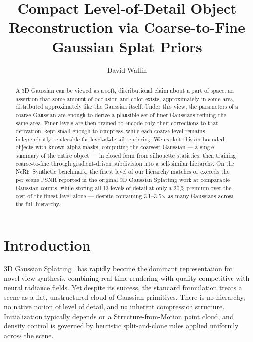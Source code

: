 \documentclass[acmtog]{acmart}
\begin{document}
\title{Compact Level-of-Detail Object Reconstruction via Coarse-to-Fine Gaussian Splat Priors}

\author{David Wallin}
\email{}

\begin{abstract}
A 3D Gaussian can be viewed as a soft, distributional claim about a part of space: an assertion that some amount of occlusion and color exists, approximately in some area, distributed approximately like the Gaussian itself. Under this view, the parameters of a coarse Gaussian are enough to derive a plausible set of finer Gaussians refining the same area. Finer levels are then trained to encode only their corrections to that derivation, kept small enough to compress, while each coarse level remains independently renderable for level-of-detail rendering. We exploit this on bounded objects with known alpha masks, computing the coarsest Gaussian --- a single summary of the entire object --- in closed form from silhouette statistics, then training coarse-to-fine through gradient-driven subdivision into a self-similar hierarchy. On the NeRF Synthetic benchmark, the finest level of our hierarchy matches or exceeds the per-scene PSNR reported in the original 3D Gaussian Splatting work at comparable Gaussian counts, while storing all 13 levels of detail at only a 20\% premium over the cost of the finest level alone --- despite containing 3.1--3.5$\times$ as many Gaussians across the full hierarchy.
\end{abstract}

\maketitle

\section{Introduction}

3D Gaussian Splatting~\cite{kerbl3Dgaussians} has rapidly become the dominant representation for novel-view synthesis, combining real-time rendering with quality competitive with neural radiance fields. Yet despite its success, the standard formulation treats a scene as a flat, unstructured cloud of Gaussian primitives. There is no hierarchy, no native notion of level of detail, and no inherent compression structure. Initialization typically depends on a Structure-from-Motion point cloud, and density control is governed by heuristic split-and-clone rules applied uniformly across the scene.
\end{document}
